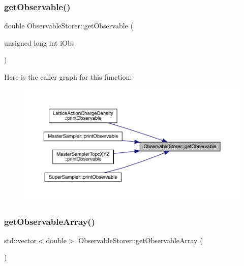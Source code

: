 \subsubsection{\texorpdfstring{getObservable()}{getObservable()}}
{\footnotesize\ttfamily double Observable\+Storer\+::get\+Observable (\begin{DoxyParamCaption}\item[{unsigned long int}]{i\+Obs }\end{DoxyParamCaption})\hspace{0.3cm}{\ttfamily [inline]}}

Here is the caller graph for this function\+:
\nopagebreak
\begin{figure}[H]
\begin{center}
\leavevmode
\includegraphics[width=350pt]{class_observable_storer_af03e1c58c3e0efff251ef9b65cc8d152_icgraph}
\end{center}
\end{figure}
\mbox{\label{class_observable_storer_ab8885ce7eb3baa3fdb39cda767be6c83}} 
\subsubsection{\texorpdfstring{getObservableArray()}{getObservableArray()}}
{\footnotesize\ttfamily std\+::vector$<$double$>$ Observable\+Storer\+::get\+Observable\+Array (\begin{DoxyParamCaption}{ }\end{DoxyParamCaption})\hspace{0.3cm}{\ttfamily [inline]}}


